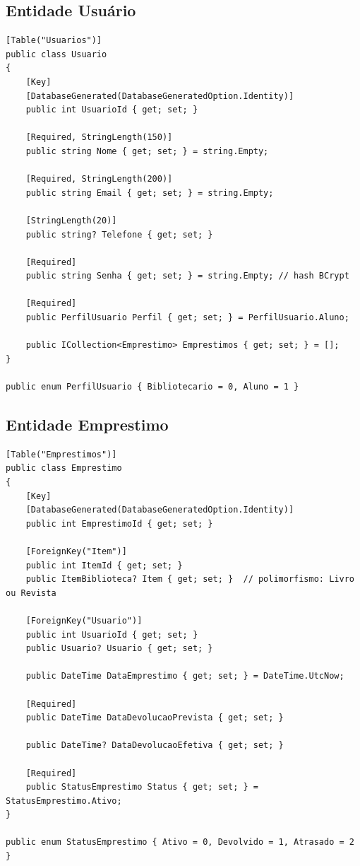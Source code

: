 \documentclass[
  12pt,
  a4paper,
  oneside,
  brazil
]{abntex2}
\begin{document}
\subsection{Entidade Usuário}

\begin{lstlisting}[style=csharp, caption={Entidade Usuario com enum de perfil}, label=lst:usuario]
[Table("Usuarios")]
public class Usuario
{
    [Key]
    [DatabaseGenerated(DatabaseGeneratedOption.Identity)]
    public int UsuarioId { get; set; }

    [Required, StringLength(150)]
    public string Nome { get; set; } = string.Empty;

    [Required, StringLength(200)]
    public string Email { get; set; } = string.Empty;

    [StringLength(20)]
    public string? Telefone { get; set; }

    [Required]
    public string Senha { get; set; } = string.Empty; // hash BCrypt

    [Required]
    public PerfilUsuario Perfil { get; set; } = PerfilUsuario.Aluno;

    public ICollection<Emprestimo> Emprestimos { get; set; } = [];
}

public enum PerfilUsuario { Bibliotecario = 0, Aluno = 1 }
\end{lstlisting}

\subsection{Entidade Emprestimo}

\begin{lstlisting}[style=csharp, caption={Entidade Emprestimo com relacionamentos}, label=lst:emprestimo]
[Table("Emprestimos")]
public class Emprestimo
{
    [Key]
    [DatabaseGenerated(DatabaseGeneratedOption.Identity)]
    public int EmprestimoId { get; set; }

    [ForeignKey("Item")]
    public int ItemId { get; set; }
    public ItemBiblioteca? Item { get; set; }  // polimorfismo: Livro ou Revista

    [ForeignKey("Usuario")]
    public int UsuarioId { get; set; }
    public Usuario? Usuario { get; set; }

    public DateTime DataEmprestimo { get; set; } = DateTime.UtcNow;

    [Required]
    public DateTime DataDevolucaoPrevista { get; set; }

    public DateTime? DataDevolucaoEfetiva { get; set; }

    [Required]
    public StatusEmprestimo Status { get; set; } = StatusEmprestimo.Ativo;
}

public enum StatusEmprestimo { Ativo = 0, Devolvido = 1, Atrasado = 2 }
\end{lstlisting}
\end{document}
